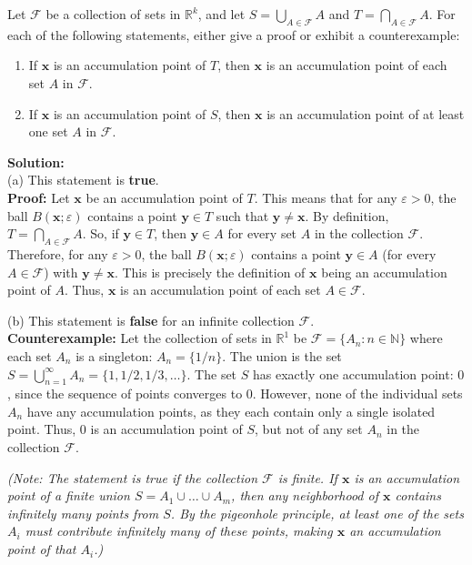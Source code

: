 \begin{problembox}            
Let $\mathcal{F}$ be a collection of sets in $\mathbb{R}^k$, and let $S = \bigcup_{A \in \mathcal{F}} A$ and $T = \bigcap_{A \in \mathcal{F}} A$. For each of the following statements, either give a proof or exhibit a counterexample:
\begin{enumerate}[label=\alph*)]
\item If $\mathbf{x}$ is an accumulation point of $T$, then $\mathbf{x}$ is an accumulation point of each set $A$ in $\mathcal{F}$.
\item If $\mathbf{x}$ is an accumulation point of $S$, then $\mathbf{x}$ is an accumulation point of at least one set $A$ in $\mathcal{F}$.
\end{enumerate}
\end{problembox}

\textbf{Solution:}\\
(a) This statement is \textbf{true}.\\
\textbf{Proof:} Let $\mathbf{x}$ be an accumulation point of $T$. This means that for any $\varepsilon > 0$, the ball $B(\mathbf{x}; \varepsilon)$ contains a point $\mathbf{y} \in T$ such that $\mathbf{y} \neq \mathbf{x}$. By definition, $T = \bigcap_{A \in \mathcal{F}} A$. So, if $\mathbf{y} \in T$, then $\mathbf{y} \in A$ for every set $A$ in the collection $\mathcal{F}$. Therefore, for any $\varepsilon > 0$, the ball $B(\mathbf{x}; \varepsilon)$ contains a point $\mathbf{y} \in A$ (for every $A \in \mathcal{F}$) with $\mathbf{y} \neq \mathbf{x}$. This is precisely the definition of $\mathbf{x}$ being an accumulation point of $A$. Thus, $\mathbf{x}$ is an accumulation point of each set $A \in \mathcal{F}$.

(b) This statement is \textbf{false} for an infinite collection $\mathcal{F}$.\\
\textbf{Counterexample:} Let the collection of sets in $\mathbb{R}^1$ be $\mathcal{F} = \{A_n : n \in \mathbb{N}\}$ where each set $A_n$ is a singleton: $A_n = \{1/n\}$.
The union is the set $S = \bigcup_{n=1}^{\infty} A_n = \{1, 1/2, 1/3, \dots\}$.
The set $S$ has exactly one accumulation point: $0$, since the sequence of points converges to $0$.
However, none of the individual sets $A_n$ have any accumulation points, as they each contain only a single isolated point.
Thus, $0$ is an accumulation point of $S$, but not of any set $A_n$ in the collection $\mathcal{F}$.

\textit{(Note: The statement is true if the collection $\mathcal{F}$ is finite. If $\mathbf{x}$ is an accumulation point of a finite union $S = A_1 \cup \dots \cup A_m$, then any neighborhood of $\mathbf{x}$ contains infinitely many points from $S$. By the pigeonhole principle, at least one of the sets $A_i$ must contribute infinitely many of these points, making $\mathbf{x}$ an accumulation point of that $A_i$.)}


